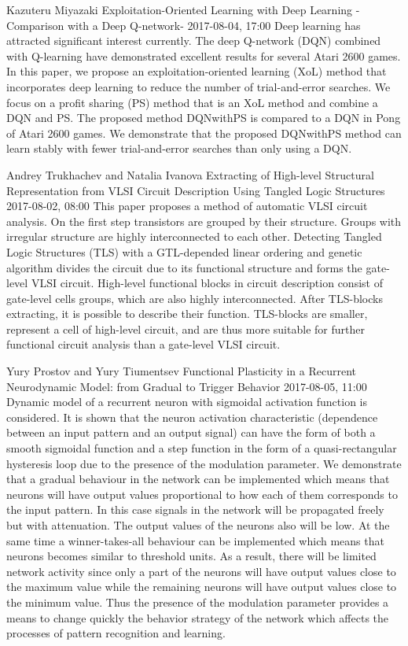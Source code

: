 \documentclass[10pt,fleqn,openany]{book} %
\begin{document}
\begin{enumerate}
		
		\paperabstract
		{Kazuteru Miyazaki}
		{Exploitation-Oriented Learning with Deep Learning   -Comparison with a Deep Q-network-}
		{2017-08-04, 17:00}
		{Deep learning has attracted significant interest currently. The deep Q-network (DQN) combined with Q-learning have demonstrated excellent results for several Atari 2600 games. In this paper, we propose an exploitation-oriented learning (XoL) method that incorporates deep learning to reduce the number of trial-and-error searches. We focus on a profit sharing (PS) method that is an XoL method and combine a DQN and PS. The proposed method DQNwithPS is compared to a DQN in Pong of Atari 2600 games. We demonstrate that the proposed DQNwithPS method can learn stably with fewer trial-and-error searches than only using a DQN.}
		
		
		\paperabstract
		{Andrey Trukhachev and Natalia Ivanova}
		{Extracting of High-level Structural Representation from VLSI Circuit Description Using Tangled Logic Structures}
		{2017-08-02, 08:00}
		{This paper proposes a method of automatic VLSI circuit analysis. On the first step transistors are grouped by their structure. Groups with irregular structure are highly interconnected to each other. Detecting Tangled Logic Structures (TLS) with a GTL-depended linear ordering and genetic algorithm divides the circuit due to its functional structure and forms the gate-level VLSI circuit.  High-level functional blocks in circuit description consist of gate-level cells groups, which are also highly interconnected. After TLS-blocks extracting, it is possible to describe their function. TLS-blocks are smaller, represent a cell of high-level circuit, and are thus more suitable for further functional circuit analysis than a gate-level VLSI circuit.}
		
		
		\paperabstract
		{Yury Prostov and Yury Tiumentsev}
		{Functional Plasticity in a Recurrent Neurodynamic Model: from Gradual to Trigger Behavior}
		{2017-08-05, 11:00}
		{Dynamic model of a recurrent neuron with sigmoidal activation function is considered. It is shown that the neuron activation characteristic (dependence between an input pattern and an output signal) can have the form of both a smooth sigmoidal function and a step function in the form of a quasi-rectangular hysteresis loop due to the presence of the modulation parameter. We demonstrate that a gradual behaviour in the network can be implemented which means that neurons will have output values proportional to how each of them corresponds to the input pattern. In this case signals in the network will be propagated freely but with attenuation. The output values of the neurons also will be low. At the same time a winner-takes-all behaviour can be implemented which means that neurons becomes similar to threshold units. As a result, there will be limited network activity since only a part of the neurons will have output values close to the maximum value while the remaining neurons will have output values close to the minimum value. Thus the presence of the modulation parameter provides a means to change quickly the behavior strategy of the network which affects the processes of pattern recognition and learning.}
		

\end{enumerate}
\end{document}
